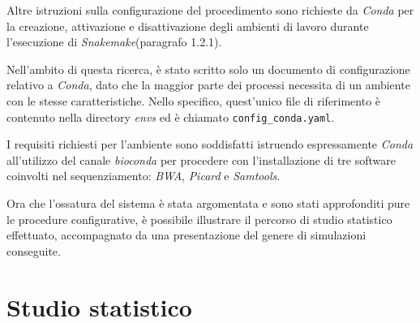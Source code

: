 Altre istruzioni sulla configurazione del procedimento sono richieste da \textit{Conda} per la creazione, attivazione e disattivazione degli ambienti di lavoro durante l'esecuzione di \textit{Snakemake}(paragrafo 1.2.1).

Nell'ambito di questa ricerca, è stato scritto solo un documento di configurazione relativo a \textit{Conda}, dato che la maggior parte dei processi necessita di un ambiente con le stesse caratteristiche.
Nello specifico, quest'unico file di riferimento è contenuto nella directory \textit{envs} ed è chiamato \verb!config_conda.yaml!.

I requisiti richiesti per l'ambiente sono soddisfatti istruendo espressamente \textit{Conda} all'utilizzo del canale \textit{bioconda} per procedere con l'installazione di tre software coinvolti nel sequenziamento: \textit{BWA}, \textit{Picard} e \textit{Samtools}.

Ora che l'ossatura del sistema è stata argomentata e sono stati approfonditi pure le procedure configurative, è possibile illustrare il percorso di studio statistico effettuato, accompagnato da una presentazione del genere di simulazioni conseguite.

\section{Studio statistico}
